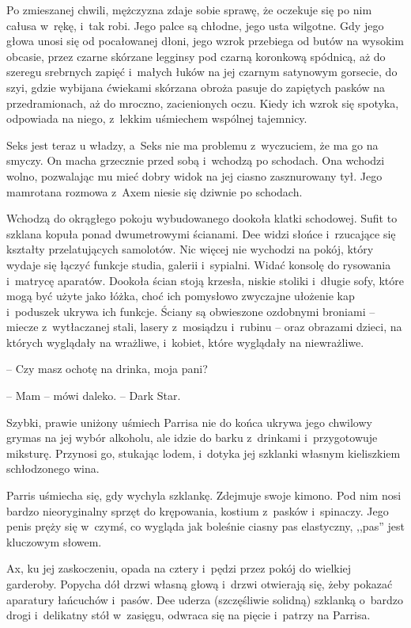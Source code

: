 \documentclass[oneside,polish,11pt,sfheadings]{mwbk}
\begin{document}
Po zmieszanej chwili, mężczyzna zdaje sobie sprawę, że oczekuje się po
nim całusa w~rękę, i~tak robi. Jego palce są chłodne, jego usta
wilgotne. Gdy jego głowa unosi się od pocałowanej dłoni, jego wzrok
przebiega od butów na wysokim obcasie, przez czarne skórzane legginsy pod
czarną koronkową spódnicą, aż do szeregu srebrnych zapięć i~małych łuków
na jej czarnym satynowym gorsecie, do szyi, gdzie wybijana ćwiekami
skórzana obroża pasuje do zapiętych pasków na przedramionach, aż do
mroczno, zacienionych oczu. Kiedy ich wzrok się spotyka, odpowiada na
niego, z~lekkim uśmiechem wspólnej tajemnicy.

Seks jest teraz u władzy, a~Seks nie ma problemu z~wyczuciem, że ma go
na smyczy. On macha grzecznie przed sobą i~wchodzą po schodach. Ona
wchodzi wolno, pozwalając mu mieć dobry widok na jej ciasno zasznurowany
tył. Jego mamrotana rozmowa z~Axem niesie się dziwnie po schodach.

Wchodzą do okrągłego pokoju wybudowanego dookoła klatki schodowej. Sufit
to szklana kopuła ponad dwumetrowymi ścianami. Dee widzi słońce i~rzucające się kształty przelatujących samolotów. Nic więcej nie wychodzi
na pokój, który wydaje się łączyć funkcje studia, galerii i~sypialni.
Widać konsolę do rysowania i~matrycę aparatów. Dookoła ścian stoją
krzesła, niskie stoliki i~długie sofy, które mogą być użyte jako łóżka,
choć ich pomysłowo zwyczajne ułożenie kap i~poduszek ukrywa ich funkcje.
Ściany są obwieszone ozdobnymi broniami -- miecze z~wytłaczanej stali,
lasery z~mosiądzu i~rubinu -- oraz obrazami dzieci, na których wyglądały
na wrażliwe, i~kobiet, które wyglądały na niewrażliwe.

-- Czy masz ochotę na drinka, moja pani?

-- Mam -- mówi daleko. -- Dark Star.

Szybki, prawie uniżony uśmiech Parrisa nie do końca ukrywa jego chwilowy
grymas na jej wybór alkoholu, ale idzie do barku z~drinkami i~przygotowuje miksturę. Przynosi go, stukając lodem, i~dotyka jej
szklanki własnym kieliszkiem schłodzonego wina.

Parris uśmiecha się, gdy wychyla szklankę. Zdejmuje swoje kimono. Pod
nim nosi bardzo nieoryginalny sprzęt do krępowania, kostium z~pasków i~spinaczy. Jego penis pręży się w~czymś, co wygląda jak boleśnie ciasny
pas elastyczny, ,,pas'' jest kluczowym słowem.

Ax, ku jej zaskoczeniu, opada na cztery i~pędzi przez pokój do wielkiej
garderoby. Popycha dół drzwi własną głową i~drzwi otwierają się, żeby
pokazać aparatury łańcuchów i~pasów. Dee uderza (szczęśliwie solidną)
szklanką o~bardzo drogi i~delikatny stół w~zasięgu, odwraca się na
pięcie i~patrzy na Parrisa.
\end{document}
